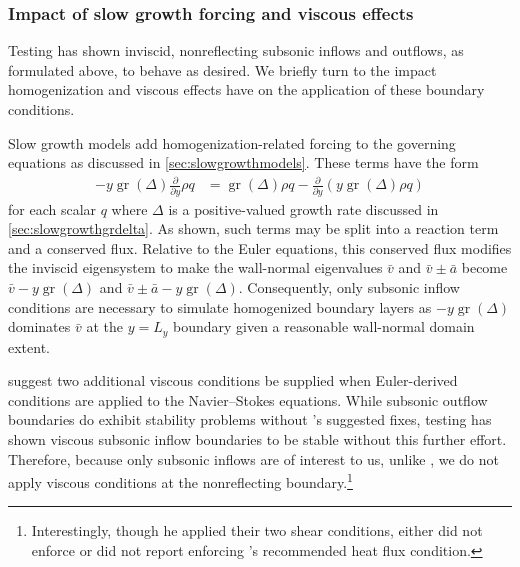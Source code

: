\documentclass[letterpaper,11pt,nointlimits,reqno,draft]{amsbook}
\begin{document}
\subsubsection{Impact of slow growth forcing and viscous effects}

Testing has shown inviscid, nonreflecting subsonic inflows and outflows, as
formulated above, to behave as desired.  We briefly turn to the impact
homogenization and viscous effects have on the application of these boundary
conditions.

Slow growth models add homogenization-related forcing to the governing equations
as discussed in \autoref{sec:slowgrowthmodels}.  These terms have the form
\begin{align}
    -y \operatorname{gr}\!\left(\Delta\right) \frac{\partial}{\partial y} \rho q
    &=
    \operatorname{gr}\!\left(\Delta\right) \rho q
    -
    \frac{\partial}{\partial y}
    \left( y \operatorname{gr}\!\left(\Delta\right) \rho q \right)
\end{align}
for each scalar $q$ where $\Delta$ is a positive-valued growth rate discussed in
\autoref{sec:slowgrowthgrdelta}.  As shown, such terms may be split into a
reaction term and a conserved flux.  Relative to the Euler equations, this
conserved flux modifies the inviscid eigensystem to make the wall-normal
eigenvalues $\bar{v}$ and $\bar{v}\pm\bar{a}$ become $\bar{v} - y
\operatorname{gr}\!\left(\Delta\right)$ and $\bar{v}\pm\bar{a} - y
\operatorname{gr}\!\left(\Delta\right)$.  Consequently, only subsonic inflow
conditions are necessary to simulate homogenized boundary layers as $-y
\operatorname{gr}\!\left(\Delta\right)$ dominates $\bar{v}$ at the $y=L_y$
boundary given a reasonable wall-normal domain extent.

\citet{Poinsot1992Boundary} suggest two additional viscous conditions be
supplied when Euler-derived conditions are applied to the Navier--Stokes
equations.  While subsonic outflow boundaries do exhibit stability problems
without \citeauthor{Poinsot1992Boundary}'s suggested fixes, testing has shown
viscous subsonic inflow boundaries to be stable without this further effort.
Therefore, because only subsonic inflows are of interest to us, unlike
\citet{Guarini1998}, we do not apply viscous conditions at the nonreflecting
boundary.\footnote{
    Interestingly, though he applied their two shear conditions,
    \citet{Guarini1998} either did not enforce or did not report enforcing
    \citeauthor{Poinsot1992Boundary}'s recommended heat flux condition.
}
\end{document}
